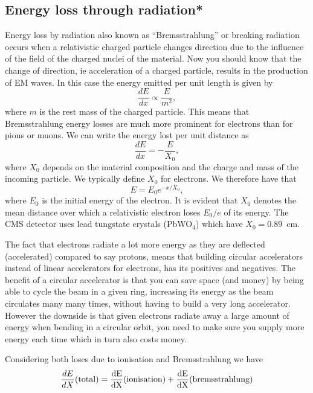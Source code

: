 \subsection{Energy loss through radiation*}
Energy loss by radiation also known as ``Bremsstrahlung'' or breaking radiation occurs when a relativistic charged particle changes direction due to the influence of the field of the charged nuclei of the material. Now you should know that the change of direction, ie acceleration of a charged particle, results in the production of EM waves. In this case the energy emitted per unit length is given by
\begin{equation}
\frac{dE}{dx}\propto \frac{E}{m^2},
\end{equation}
where $m$ is the rest mass of the charged particle. This means that Bremsstrahlung energy losses are much more prominent for electrons than for pions or muons. We can write the energy lost per unit distance as
\begin{equation}
\frac{dE}{dx}=-\frac{E}{X_{0}},
\end{equation}
where $X_0$ depends on the material composition and the charge and mass of the incoming particle. We typically define $X_0$ for electrons. We therefore have that
\begin{equation}
E=E_0e^{-x/X_0},
\end{equation}
where $E_0$ is the initial energy of the electron.
It is evident that $X_0$ denotes the mean distance over which a relativistic electron loses $E_0/e$ of its energy. The CMS detector uses lead tungstate crystals (PbWO$_4$) which have $X_0=0.89$~cm.

The fact that electrons radiate a lot more energy as they are deflected (accelerated) compared to say protons, means that building circular accelerators instead of linear accelerators for electrons, has its positives and negatives. The benefit of a circular accelerator is that you can save space (and money) by being able to cycle the beam in a given ring, increasing its energy as the beam circulates many many times, without having to build a very long accelerator. However the downside is that given electrons radiate away a large amount of energy when bending in a circular orbit, you need to make sure you supply more energy each time which in turn also costs money.

Considering both loses due to ionisation and Bremsstrahlung we have
\begin{equation}
\frac{dE}{dX}(\rm total)=\frac{dE}{dX}({\rm ionisation})+\frac{dE}{dX}({\rm bremsstrahlung})
\end{equation}

